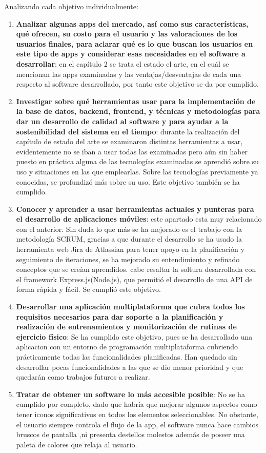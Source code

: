 Analizando cada objetivo individualmente:
\begin{enumerate}
	\item \textbf{Analizar algunas apps del mercado, así como sus características, qué ofrecen, su costo para el usuario y las valoraciones de los usuarios finales, para aclarar qué es lo que buscan los usuarios en este tipo de apps y considerar esas necesidades en el software a desarrollar}: en el capítulo 2 se trata el estado el arte, en el cuál se mencionan las apps examinadas y las ventajas/desventajas de cada una respecto al software desarrollado, por tanto este objetivo se da por cumplido.
	\item \textbf{Investigar sobre qué herramientas usar para la implementación de la base de datos, backend, frontend, y técnicas y metodologías para dar un desarrollo de calidad al software y para ayudar a la sostenibilidad del sistema en el tiempo}: durante la realización del capítulo de estado del arte se examinaron distintas herramientas a usar, evidentemente no se iban a usar todas las examinadas pero aún sin haber puesto en práctica alguna de las tecnologías examinadas se aprendió sobre su uso y situaciones en las que emplearlas. Sobre las tecnologías previamente ya conocidas, se profundizó más sobre su uso. Este objetivo también se ha cumplido.
	\item \textbf{Conocer y aprender a usar herramientas actuales y punteras para el desarrollo de aplicaciones móviles}: este apartado esta muy relacionado con el anterior. Sin duda lo que más se ha mejorado es el trabajo con la metodología SCRUM, gracias a que durante el desarrollo se ha usado la herramienta web Jira de Atlassian para tener apoyo en la planificación y seguimiento de iteraciones, se ha mejorado su entendimiento y refinado conceptos que se creían aprendidos. cabe resaltar la soltura desarrollada con el framework Express.js(Node.js), que permitió el desarrollo de una API de forma rápida y fácil. Se cumplió este objetivo.
	\item \textbf{Desarrollar una aplicación multiplataforma que cubra todos los requisitos necesarios para dar soporte a la planificación y realización de entrenamientos y monitorización de rutinas de ejercicio físico}: Se ha cumplido este objetivo, pues se ha desarrollado una aplicacion con un entorno de programación multiplataforma cubriendo prácticamente todas las funcionalidades planificadas. Han quedado sin desarrollar pocas funcionalidades a las que se dio menor prioridad y que quedarán como trabajos futuros  a realizar.
	\item \textbf{Tratar de obtener un software lo más accesible posible}: No se ha cumplido por completo, dado que habría que mejorar algunos aspectos como tener iconos significativos en todos los elementos seleccionables. No obstante, el usuario siempre controla el flujo de la app, el software nunca hace cambios bruscos de pantalla ,ni presenta destellos molestos además de poseer una paleta de colores que relaja al usuario.
\end{enumerate}

